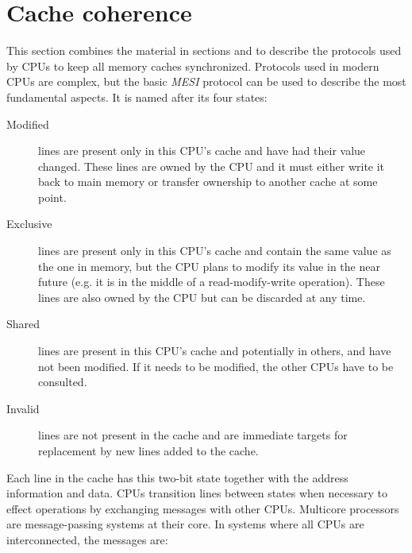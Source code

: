 \section{Cache coherence}

\label{sec:conc:coherence}

This section combines the material in sections  and
 to describe the protocols used by CPUs to keep all
memory caches synchronized.  Protocols used in modern CPUs are complex, but the
basic \textit{MESI} protocol can be used to describe the most fundamental
aspects.  It is named after its four states:

\begin{description}
    \item[Modified]
        lines are present only in this CPU's cache and have had their value
        changed.  These lines are owned by the CPU and it must either write it
        back to main memory or transfer ownership to another cache at some
        point.
    \item[Exclusive]
        lines are present only in this CPU's cache and contain the same value as
        the one in memory, but the CPU plans to modify its value in the near
        future (e.g. it is in the middle of a read-modify-write operation).
        These lines are also owned by the CPU but can be discarded at any time.
    \item[Shared]
        lines are present in this CPU's cache and potentially in others, and
        have not been modified.  If it needs to be modified, the other CPUs have
        to be consulted.
    \item[Invalid]
        lines are not present in the cache and are immediate targets for
        replacement by new lines added to the cache.
\end{description}

Each line in the cache has this two-bit state together with the address
information and data.  CPUs transition lines between states when necessary to
effect operations by exchanging messages with other CPUs.  Multicore processors
are message-passing systems at their core.  In systems where all CPUs are
interconnected, the messages are:

